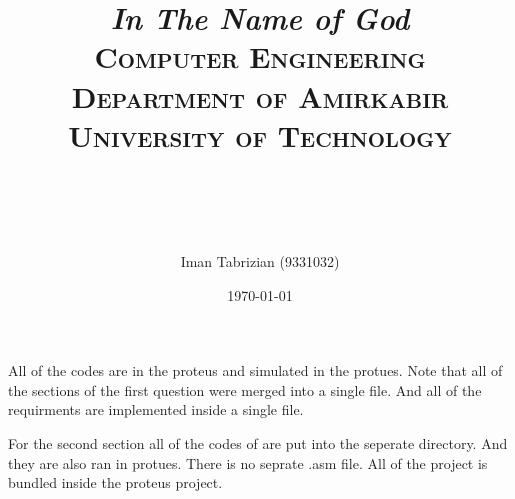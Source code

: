 \documentclass[paper=a4, fontsize=11pt]{scrartcl} %
\title{
\normalfont \normalsize
\textit{In The Name of God} \\ \textsc{Computer Engineering Department of Amirkabir University of Technology} \\ [25pt] \horrule{0.5pt} \\[0.4cm] %
\horrule{2pt} \\[0.5cm] %
}
\author{Iman Tabrizian (9331032)}
\date{\normalsize\today}
\numberwithin{equation}{section} %
\numberwithin{figure}{section} %
\numberwithin{table}{section} %
\begin{document}
\maketitle
All of the codes are in the proteus and simulated in the protues. Note that
all of the sections of the first question were merged into a single file. And all of
the requirments are implemented inside a single file.

For the second section all of the codes of are put into the seperate directory.
And they are also ran in protues. There is no seprate .asm file. All of the project
is bundled inside the proteus project.
\end{document}
